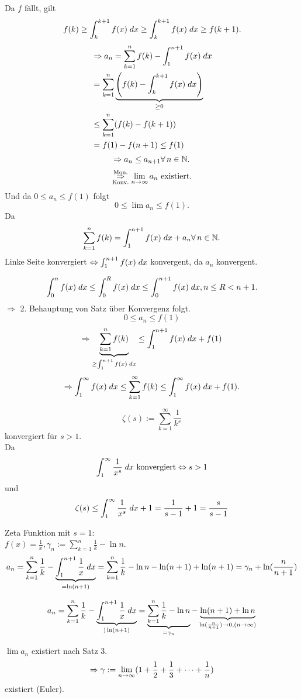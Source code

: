 \documentclass[../ana2.tex]{subfiles}
\begin{document}
\begin{bew}
    Da \(f\) fällt, gilt 
    \[ f(k) \geq \integral{f(x)}{k}{k+1} 
    \geq \integral{f(x)}{k}{k+1} 
    \geq f(k+1). \]
    \begin{align*}
        &\Rightarrow a_n = \sum_{k=1}^n f(k) 
        - \integral{f(x)}{1}{n+1} \\
        &= \sum_{k=1}^n 
        \underbrace{\left( f(k) - \integral{f(x)}{k}{k+1} \right)}
        _{\geq 0} \\
        &\leq \sum_{k=1}^n (f(k)-f(k+1)) \\
        &= f(1) - f(n+1) \leq f(1)
    \end{align*}
    \[ \Rightarrow a_n \leq a_{n+1} \forall n\in\N. \]
    \[ \overundersett{Mon.}{Konv.}{\Rightarrow} 
    \limes{n} a_n \text{ existiert}. \]
    Und da \( 0 \leq a_n \leq f(1) \) folgt 
    \[ 0 \leq \lim a_n \leq f(1). \]
    Da \[ \sum_{k=1}^n f(k) 
    = \integral{f(x)}{1}{n+1} + a_n \forall n\in\N. \]
    Linke Seite konvergiert 
    \( \Leftrightarrow \integral{f(x)}{1}{n+1} \) konvergent, 
    da \( a_n \) konvergent.

    \[ \integral{f(x)}{0}{n} \leq \integral{f(x)}{0}{R} 
    \leq \integral{f(x)}{0}{n+1}, n\leq R < n+1. \]
    \( \Rightarrow \) 2. Behauptung von Satz über Konvergenz 
    folgt.
    \[ 0 \leq a_n \leq f(1) \]
    \[ \Rightarrow \underbrace{\sum_{k=1}^n f(k)}
    _{\geq \integral{f(x)}{1}{n+1}}
    \leq \integral{f(x)}{1}{n+1} + f(1) \]
    \[ \Rightarrow \integral{f(x)}{1}{\infty} 
    \leq \sum_{k=1}^\infty f(k) 
    \leq \integral{f(x)}{1}{\infty} + f(1). \]
\end{bew}
\begin{bsp}
    \[ \zeta(s) := \sum_{k=1}^\infty \frac{1}{k^s} \]
    konvergiert für \(s>1\). \\
    Da
    \[ \integral{\frac{1}{x^s}}{1}{\infty} \text{ konvergiert}
    \Leftrightarrow s > 1  \]
    und 
    \[ \zeta(s) \leq \integral{\frac{1}{x^s}}{1}{\infty} + 1
    = \frac{1}{s-1} + 1 = \frac{s}{s-1} \]
\end{bsp}
\begin{bsp}
    Zeta Funktion mit \(s = 1\): \\
    \( f(x) = \frac{1}{x}, 
    \gamma_n := \sum_{k=1}^n \frac{1}{k} - \ln n \).
    \[ a_n = \sum_{k=1}^n \frac{1}{k} 
    - \underbrace{\integral{\frac{1}{x}}{1}{n+1}}_{=\ln(n+1)} 
    = \sum_{k=1}^n \frac{1}{k} - \ln n 
    - \ln(n+1) + \ln(n+1) = \gamma_n + \ln(\frac{n}{n+1}) \]

    \[ a_n = \sum_{k=1}^n \frac{1}{k} - 
    \underbrace{\integral{\frac{1}{x}}{1}{n+1}}_{) \ln(n+1)}
    = \underbrace{\sum_{k=1}^n \frac{1}{k} - \ln n}_{= \gamma_n}
    - \underbrace{\ln(n+1) + \ln n}
    _{\ln (\frac{n}{n+1}) \rightarrow 0, (n\rightarrow \infty)} \]

    \( \lim a_n \) existiert nach Satz 3.
    \[ \Rightarrow \gamma := 
    \limes{n} (1+ \frac{1}{2} + \frac{1}{3} + \dots + \frac{1}{n}) \]
    existiert (Euler).
\end{bsp}
\end{document}
